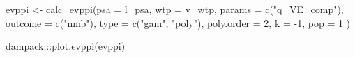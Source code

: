 \documentclass[
]{article}
\newenvironment{Shaded}{\begin{snugshade}}{\end{snugshade}}
\newcommand{\AttributeTok}[1]{\textcolor[rgb]{0.77,0.63,0.00}{#1}}
\newcommand{\DecValTok}[1]{\textcolor[rgb]{0.00,0.00,0.81}{#1}}
\newcommand{\FunctionTok}[1]{\textcolor[rgb]{0.00,0.00,0.00}{#1}}
\newcommand{\NormalTok}[1]{#1}
\newcommand{\OtherTok}[1]{\textcolor[rgb]{0.56,0.35,0.01}{#1}}
\newcommand{\SpecialCharTok}[1]{\textcolor[rgb]{0.00,0.00,0.00}{#1}}
\newcommand{\StringTok}[1]{\textcolor[rgb]{0.31,0.60,0.02}{#1}}
\begin{document}
\begin{Shaded}
\begin{Highlighting}[]
\NormalTok{evppi }\OtherTok{\textless{}{-}} \FunctionTok{calc\_evppi}\NormalTok{(}\AttributeTok{psa =}\NormalTok{ l\_psa, }
                    \AttributeTok{wtp =}\NormalTok{ v\_wtp, }
                    \AttributeTok{params =} \FunctionTok{c}\NormalTok{(}\StringTok{"q\_VE\_comp"}\NormalTok{), }
                    \AttributeTok{outcome =} \FunctionTok{c}\NormalTok{(}\StringTok{"nmb"}\NormalTok{),}
                    \AttributeTok{type =} \FunctionTok{c}\NormalTok{(}\StringTok{"gam"}\NormalTok{, }\StringTok{"poly"}\NormalTok{),}
                    \AttributeTok{poly.order =} \DecValTok{2}\NormalTok{,}
                    \AttributeTok{k =} \SpecialCharTok{{-}}\DecValTok{1}\NormalTok{,}
                    \AttributeTok{pop =} \DecValTok{1}
\NormalTok{)}

\NormalTok{dampack}\SpecialCharTok{:::}\FunctionTok{plot.evppi}\NormalTok{(evppi)}
\end{Highlighting}
\end{Shaded}
\end{document}
